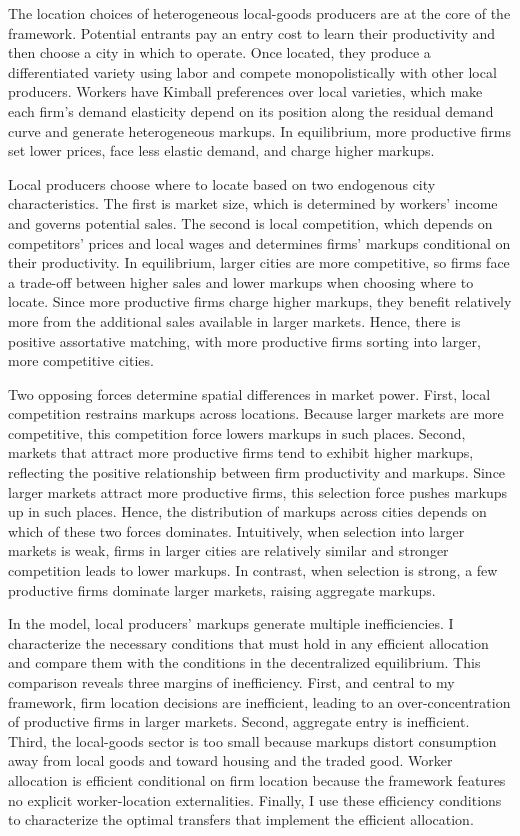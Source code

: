 The location choices of heterogeneous local-goods producers are at the core of the framework. Potential entrants pay an entry cost to learn their productivity and then choose a city in which to operate. Once located, they produce a differentiated variety using labor and compete monopolistically with other local producers. Workers have Kimball preferences \parencite{Kimball95} over local varieties, which make each firm’s demand elasticity depend on its position along the residual demand curve and generate heterogeneous markups. In equilibrium, more productive firms set lower prices, face less elastic demand, and charge higher markups.

Local producers choose where to locate based on two endogenous city characteristics. The first is market size, which is determined by workers’ income and governs potential sales. The second is local competition, which depends on competitors’ prices and local wages and determines firms’ markups conditional on their productivity. In equilibrium, larger cities are more competitive, so firms face a trade-off between higher sales and lower markups when choosing where to locate. Since more productive firms charge higher markups, they benefit relatively more from the additional sales available in larger markets. Hence, there is positive assortative matching, with more productive firms sorting into larger, more competitive cities.

Two opposing forces determine spatial differences in market power. First, local competition restrains markups across locations. Because larger markets are more competitive, this competition force lowers markups in such places. Second, markets that attract more productive firms tend to exhibit higher markups, reflecting the positive relationship between firm productivity and markups. Since larger markets attract more productive firms, this selection force pushes markups up in such places. Hence, the distribution of markups across cities depends on which of these two forces dominates. Intuitively, when selection into larger markets is weak, firms in larger cities are relatively similar and stronger competition leads to lower markups. In contrast, when selection is strong, a few productive firms dominate larger markets, raising aggregate markups.

In the model, local producers' markups generate multiple inefficiencies. I characterize the necessary conditions that must hold in any efficient allocation and compare them with the conditions in the decentralized equilibrium. This comparison reveals three margins of inefficiency. First, and central to my framework, firm location decisions are inefficient, leading to an over-concentration of productive firms in larger markets. Second, aggregate entry is inefficient. Third, the local-goods sector is too small because markups distort consumption away from local goods and toward housing and the traded good. Worker allocation is efficient conditional on firm location because the framework features no explicit worker-location externalities. Finally, I use these efficiency conditions to characterize the optimal transfers that implement the efficient allocation.

